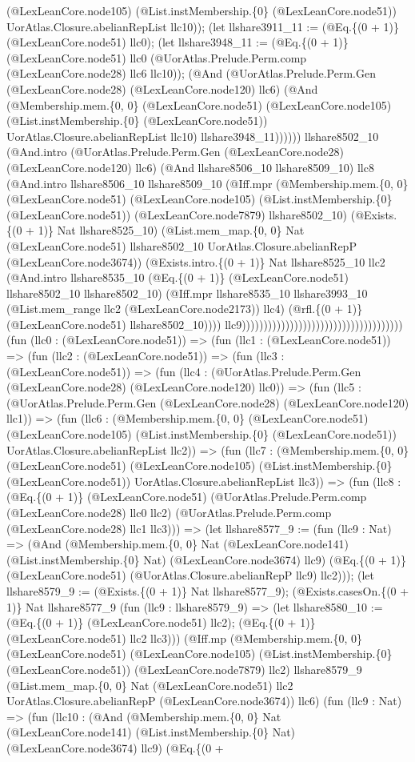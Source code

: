 \documentclass[11pt]{article}
\begin{document}
(@LexLeanCore.node105) (@List.instMembership.\{0\} (@LexLeanCore.node51)) UorAtlas.Closure.abelianRepList llc10)); (let llshare3911\_11 := (@Eq.\{(0 + 1)\} (@LexLeanCore.node51) llc0); (let llshare3948\_11 := (@Eq.\{(0 + 1)\} (@LexLeanCore.node51) llc0 (@UorAtlas.Prelude.Perm.comp (@LexLeanCore.node28) llc6 llc10)); (@And (@UorAtlas.Prelude.Perm.Gen (@LexLeanCore.node28) (@LexLeanCore.node120) llc6) (@And (@Membership.mem.\{0, 0\} (@LexLeanCore.node51) (@LexLeanCore.node105) (@List.instMembership.\{0\} (@LexLeanCore.node51)) UorAtlas.Closure.abelianRepList llc10) llshare3948\_11)))))) llshare8502\_10 (@And.intro (@UorAtlas.Prelude.Perm.Gen (@LexLeanCore.node28) (@LexLeanCore.node120) llc6) (@And llshare8506\_10 llshare8509\_10) llc8 (@And.intro llshare8506\_10 llshare8509\_10 (@Iff.mpr (@Membership.mem.\{0, 0\} (@LexLeanCore.node51) (@LexLeanCore.node105) (@List.instMembership.\{0\} (@LexLeanCore.node51)) (@LexLeanCore.node7879) llshare8502\_10) (@Exists.\{(0 + 1)\} Nat llshare8525\_10) (@List.mem\_map.\{0, 0\} Nat (@LexLeanCore.node51) llshare8502\_10 UorAtlas.Closure.abelianRepP (@LexLeanCore.node3674)) (@Exists.intro.\{(0 + 1)\} Nat llshare8525\_10 llc2 (@And.intro llshare8535\_10 (@Eq.\{(0 + 1)\} (@LexLeanCore.node51) llshare8502\_10 llshare8502\_10) (@Iff.mpr llshare8535\_10 llshare3993\_10 (@List.mem\_range llc2 (@LexLeanCore.node2173)) llc4) (@rfl.\{(0 + 1)\} (@LexLeanCore.node51) llshare8502\_10)))) llc9))))))))))))))))))))))))))))))))))))) (fun (llc0 : (@LexLeanCore.node51)) => (fun (llc1 : (@LexLeanCore.node51)) => (fun (llc2 : (@LexLeanCore.node51)) => (fun (llc3 : (@LexLeanCore.node51)) => (fun (llc4 : (@UorAtlas.Prelude.Perm.Gen (@LexLeanCore.node28) (@LexLeanCore.node120) llc0)) => (fun (llc5 : (@UorAtlas.Prelude.Perm.Gen (@LexLeanCore.node28) (@LexLeanCore.node120) llc1)) => (fun (llc6 : (@Membership.mem.\{0, 0\} (@LexLeanCore.node51) (@LexLeanCore.node105) (@List.instMembership.\{0\} (@LexLeanCore.node51)) UorAtlas.Closure.abelianRepList llc2)) => (fun (llc7 : (@Membership.mem.\{0, 0\} (@LexLeanCore.node51) (@LexLeanCore.node105) (@List.instMembership.\{0\} (@LexLeanCore.node51)) UorAtlas.Closure.abelianRepList llc3)) => (fun (llc8 : (@Eq.\{(0 + 1)\} (@LexLeanCore.node51) (@UorAtlas.Prelude.Perm.comp (@LexLeanCore.node28) llc0 llc2) (@UorAtlas.Prelude.Perm.comp (@LexLeanCore.node28) llc1 llc3))) => (let llshare8577\_9 := (fun (llc9 : Nat) => (@And (@Membership.mem.\{0, 0\} Nat (@LexLeanCore.node141) (@List.instMembership.\{0\} Nat) (@LexLeanCore.node3674) llc9) (@Eq.\{(0 + 1)\} (@LexLeanCore.node51) (@UorAtlas.Closure.abelianRepP llc9) llc2))); (let llshare8579\_9 := (@Exists.\{(0 + 1)\} Nat llshare8577\_9); (@Exists.casesOn.\{(0 + 1)\} Nat llshare8577\_9 (fun (llc9 : llshare8579\_9) => (let llshare8580\_10 := (@Eq.\{(0 + 1)\} (@LexLeanCore.node51) llc2); (@Eq.\{(0 + 1)\} (@LexLeanCore.node51) llc2 llc3))) (@Iff.mp (@Membership.mem.\{0, 0\} (@LexLeanCore.node51) (@LexLeanCore.node105) (@List.instMembership.\{0\} (@LexLeanCore.node51)) (@LexLeanCore.node7879) llc2) llshare8579\_9 (@List.mem\_map.\{0, 0\} Nat (@LexLeanCore.node51) llc2 UorAtlas.Closure.abelianRepP (@LexLeanCore.node3674)) llc6) (fun (llc9 : Nat) => (fun (llc10 : (@And (@Membership.mem.\{0, 0\} Nat (@LexLeanCore.node141) (@List.instMembership.\{0\} Nat) (@LexLeanCore.node3674) llc9) (@Eq.\{(0 + 
\end{document}
